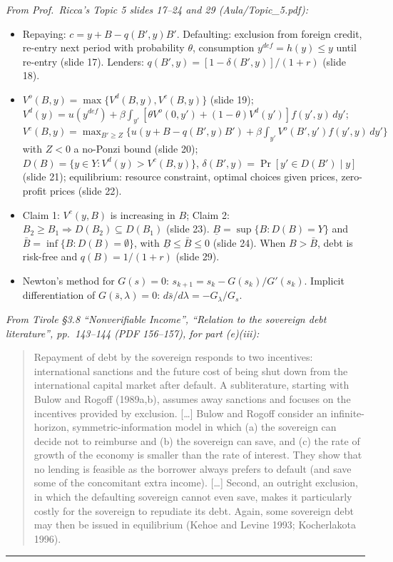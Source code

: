 \documentclass[11pt,a4paper]{article}
\providecommand{\tightlist}{\setlength{\itemsep}{0pt}\setlength{\parskip}{0pt}}
\newcommand{\stmtend}{\par\endgroup\nopagebreak\noindent\rule{\linewidth}{0.4pt}\par\medskip}
\begin{document}
\emph{From Prof.~Ricca's Topic 5 slides 17--24 and 29 (Aula/Topic\_5.pdf):}

\begin{itemize}
\tightlist
\item
  Repaying: \(c = y + B - q(B', y)B'\). Defaulting: exclusion from foreign credit, re-entry next
  period with probability \(\theta\), consumption \(y^{def} = h(y) \le y\) until re-entry (slide
  17). Lenders: \(q(B', y) = [1 - \delta(B', y)]/(1 + r)\) (slide 18).
\item
  \(V^o(B, y) = \max\{V^d(B, y), V^c(B, y)\}\) (slide 19);
  \(V^d(y) = u(y^{def}) + \beta\int_{y'}[\theta V^o(0, y') + (1 - \theta)V^d(y')]f(y', y)\,dy'\);
  \(V^c(B, y) = \max_{B' \ge Z}\{u(y + B - q(B', y)B') + \beta\int_{y'}V^o(B', y')f(y', y)\,dy'\}\)
  with \(Z < 0\) a no-Ponzi bound (slide 20); \(D(B) = \{y \in Y : V^d(y) > V^c(B, y)\}\),
  \(\delta(B', y) = \Pr[y' \in D(B') \mid y]\) (slide 21); equilibrium: resource constraint, optimal
  choices given prices, zero-profit prices (slide 22).
\item
  Claim 1: \(V^c(y, B)\) is increasing in \(B\); Claim 2:
  \(B_2 \ge B_1 \Rightarrow D(B_2) \subseteq D(B_1)\) (slide 23).
  \(\underline B = \sup\{B : D(B) = Y\}\) and \(\bar B = \inf\{B : D(B) = \emptyset\}\), with
  \(\underline B \le \bar B \le 0\) (slide 24). When \(B > \bar B\), debt is risk-free and
  \(q(B) = 1/(1 + r)\) (slide 29).
\item
  Newton's method for \(G(s) = 0\): \(s_{k+1} = s_k - G(s_k)/G'(s_k)\). Implicit differentiation of
  \(G(\bar s, \lambda) = 0\): \(d\bar s/d\lambda = -G_\lambda/G_s\).
\end{itemize}

\emph{From Tirole §3.8 ``Nonverifiable Income'', ``Relation to the sovereign debt literature'',
pp.~143--144 (PDF 156--157), for part (e)(iii):}

\begin{quote}
Repayment of debt by the sovereign responds to two incentives: international sanctions and the
future cost of being shut down from the international capital market after default. A subliterature,
starting with Bulow and Rogoff (1989a,b), assumes away sanctions and focuses on the incentives
provided by exclusion. {[}\ldots{]} Bulow and Rogoff consider an infinite-horizon,
symmetric-information model in which (a) the sovereign can decide not to reimburse and (b) the
sovereign can save, and (c) the rate of growth of the economy is smaller than the rate of interest.
They show that no lending is feasible as the borrower always prefers to default (and save some of
the concomitant extra income). {[}\ldots{]} Second, an outright exclusion, in which the defaulting
sovereign cannot even save, makes it particularly costly for the sovereign to repudiate its debt.
Again, some sovereign debt may then be issued in equilibrium (Kehoe and Levine 1993; Kocherlakota
1996).
\end{quote}
\stmtend
\end{document}
